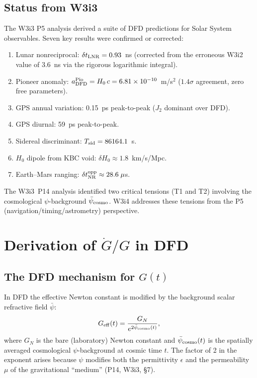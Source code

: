 \documentclass[aps,prd,twocolumn,superscriptaddress,nofootinbib,longbibliography]{revtex4-2}
\newcommand{\psibar}{\bar{\psi}}
\newcommand{\ee}[1]{\times 10^{#1}}
\begin{document}
\subsection{Status from W3i3}

The W3i3 P5 analysis derived a suite of DFD predictions for Solar System
observables.  Seven key results were confirmed or corrected:
\begin{enumerate}
\item Lunar nonreciprocal: $\delta t_{\rm LNR} = 0.93$~ns (corrected from
  the erroneous W3i2 value of 3.6~ns via the rigorous logarithmic integral).
\item Pioneer anomaly: $a_{\rm DFD}^{\rm Pio} = H_0\,c = 6.81\ee{-10}$~m/s$^2$
  ($1.4\sigma$ agreement, zero free parameters).
\item GPS annual variation: 0.15~ps peak-to-peak ($J_2$ dominant over DFD).
\item GPS diurnal: 59~ps peak-to-peak.
\item Sidereal discriminant: $T_{\rm sid} = 86164.1$~s.
\item $H_0$ dipole from KBC void: $\delta H_0 \approx 1.8$~km/s/Mpc.
\item Earth--Mars ranging: $\delta t_{\rm NR}^{\rm opp} \approx 28.6\;\mu$s.
\end{enumerate}

The W3i3~P14 analysis identified two critical tensions (T1 and T2) involving
the cosmological $\psi$-background $\psibar_{\rm cosmo}$.  W3i4 addresses
these tensions from the P5 (navigation/timing/astrometry) perspective.

\section{Derivation of $\dot{G}/G$ in DFD}
\label{sec:Gdot-derivation}

\subsection{The DFD mechanism for $G(t)$}

In DFD the effective Newton constant is modified by the background scalar
refractive field $\psibar$:
\begin{equation}
G_{\rm eff}(t) = \frac{G_N}{e^{2\psibar_{\rm cosmo}(t)}},
\label{eq:G-eff}
\end{equation}
where $G_N$ is the bare (laboratory) Newton constant and $\psibar_{\rm cosmo}(t)$
is the spatially averaged cosmological $\psi$-background at cosmic time $t$.
The factor of 2 in the exponent arises because $\psi$ modifies both the
permittivity $\epsilon$ and the permeability $\mu$ of the gravitational
``medium'' (P14, W3i3, \S7).
\end{document}
